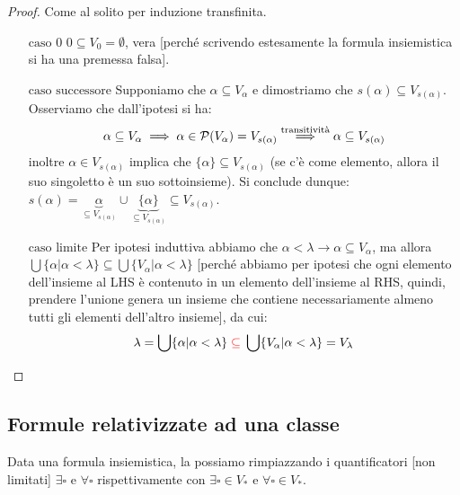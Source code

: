 \begin{proof}
	Come al solito per induzione transfinita.
	\begin{itemize}
		\item[$\boxed{\text{caso $0$}}$] $0 \subseteq V_0 = \emptyset$, vera [perché scrivendo estesamente la formula insiemistica si ha una premessa falsa].
		\item[$\boxed{\text{caso successore}}$] Supponiamo che $\alpha \subseteq V_\alpha$ e dimostriamo che $s(\alpha) \subseteq V_{s(\alpha)}$. Osserviamo che dall'ipotesi si ha:
		\[ \alpha \subseteq V_\alpha \implies \alpha \in \mathcal{P}(V_\alpha) = V_{s(\alpha)} \overset{\text{transitività}}{\implies} \alpha \subseteq V_{s(\alpha)}
			\]
		inoltre $\alpha \in V_{s(\alpha)}$ implica che $\{\alpha\} \subseteq V_{s(\alpha)}$ (se c'è come elemento, allora il suo singoletto è un suo sottoinsieme). Si conclude dunque: $s(\alpha) = \underbrace{\alpha}_{\subseteq V_{s(\alpha)}} \cup \underbrace{\{\alpha\}}_{\subseteq V_{s(\alpha)}} \subseteq V_{s(\alpha)}$.
		\item[$\boxed{\text{caso limite}}$] Per ipotesi induttiva abbiamo che $\alpha < \lambda \rightarrow \alpha \subseteq V_\alpha$, ma allora $\bigcup\{\alpha | \alpha < \lambda\} \subseteq \bigcup\{V_\alpha | \alpha < \lambda\}$ [perché abbiamo per ipotesi che ogni elemento dell'insieme al LHS è contenuto in un elemento dell'insieme al RHS, 
		quindi, prendere l'unione genera un insieme che contiene necessariamente almeno tutti gli elementi dell'altro insieme], da cui:
		\[ \lambda = \bigcup\{\alpha | \alpha < \lambda\} \;\textcolor{red}{\subseteq}\; \bigcup\{V_\alpha | \alpha < \lambda\} = V_\lambda
			\]
	\end{itemize}
\end{proof}

\subsection{Formule relativizzate ad una classe}

\begin{definition}[Relativizzazione a $V_*$]
	Data una formula insiemistica, la possiamo  rimpiazzando i quantificatori [non limitati] $\exists \square$ e $\forall \square$ rispettivamente con $\exists \square \in V_*$ e $\forall \square \in V_*$.
\end{definition}

